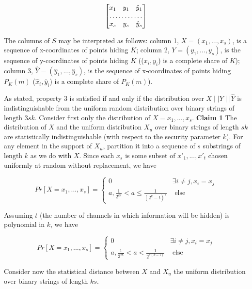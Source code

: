 \documentclass{article}
\begin{document}
\[
\begin{bmatrix}
    x_1 & y_1 & \hat{y}_1 \\
    \hdotsfor{3} \\
    x_s & y_s & \hat{y}_s 
\end{bmatrix}
\]

The columns of $S$ may be interpreted as follows: column 1, $X=(x_1,...,x_s)$, is a sequence of x-coordinates of points hiding 
$K$; column 2, $Y=(y_1,...,y_s)$, is the sequence of y-coordinates of points hiding $K$ (($x_i,y_i$) is a complete share of $K$); column 3, $\hat{Y} = (\hat{y}_1,...,\hat{y}_s)$, is the sequence of x-coordinates of points hiding $P_K(m)$
($\hat{x}_i,\hat{y}_i$) is a complete share of $P_K(m)$).

As stated, property 3 is satisfied if and only if the distribution over $X \mid \mid Y \mid \mid \hat{Y}$ is indistinguishable 
from the uniform random distribution over binary strings of length $3sk$.  Consider first only the distribution of $X=x_1,...,x_s$.  
\newline\newline
\noindent \textbf{Claim 1} The distribution of $X$ and the uniform distribution $X_u$ over binary strings of length $sk$ are statistically 
indistinguishable (with respect to the security parameter $k$). 
\newline\newline
\noindent For any element in the support of $X_u$, partition it into a sequence of $s$ substrings of length $k$ as we 
do with $X$.  Since each $x_s$ is some subset of $x'_{1},...,x'_{t}$ chosen uniformly at random without replacement, we have 

\[
Pr[X=x_1,..., x_s] = \begin{cases} 
      0 & \exists i \neq j, x_i = x_j \\
      a, \frac{1}{2^{ks}} < a \leq \frac{1}{(2^k - t)^s} & \text{ else}
   \end{cases}
\]

\noindent Assuming $t$ (the number of channels in which information will be hidden) is polynomial in $k$, we have

\[
Pr[X=x_1,...,x_s] = \begin{cases} 
      0 & \exists i \neq j, x_i = x_j \\
      a, \frac{1}{2^{sk}} < a < \frac{1}{2^{s(k-1)}} & \text{ else}
   \end{cases}
\]

\noindent Consider now the statistical distance between $X$ and $X_u$ the uniform distribution over binary strings of 
length $ks$.
\end{document}
